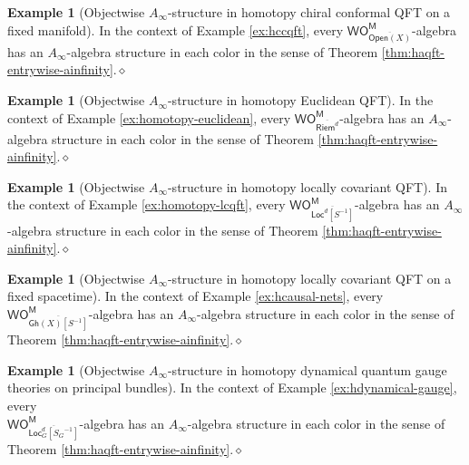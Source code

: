 \documentclass[11pt]{amsbook}
\numberwithin{section}{chapter}
\numberwithin{subsection}{section}
\numberwithin{equation}{section}
\theoremstyle{plain}
\theoremstyle{definition}
\newtheorem{example}[equation]{Example}
\newcommand{\M}{\mathsf{M}}
\renewcommand{\O}{\mathsf{O}}
\newcommand{\Otom}{\O^{\M}}
\newcommand{\W}{\mathsf{W}}
\newcommand{\dqed}{\hfill$\diamond$}
\newcommand{\inv}[1]{{#1}^{-1}}
\newcommand{\Sinv}{\inv{S}}
\newcommand{\Bgloc}{\Locd_G}
\newcommand{\Bglocsginv}{\Bgloc[\inv{S_G}]}
\newcommand{\Bglocsginvbar}{\overline{\Bglocsginv}}
\newcommand{\Gh}{\mathsf{Gh}}
\newcommand{\Ghx}{\Gh(X)}
\newcommand{\Ghxsinvbar}{\overline{\Ghx[\Sinv]}}
\newcommand{\Loc}{\mathsf{Loc}}
\newcommand{\Locd}{\Loc^d}
\newcommand{\Locdsinv}{\Locd[\Sinv]}
\newcommand{\Locdsinvbar}{\overline{\Locdsinv}}
\newcommand{\Open}{\mathsf{Open}}
\newcommand{\Openx}{\Open(X)}
\newcommand{\Openxbar}{\overline{\Openx}}
\newcommand{\Riem}{\mathsf{Riem}}
\newcommand{\Riemd}{\Riem^d}
\newcommand{\Riemdbar}{\overline{\Riemd}}
\newcommand{\wom}{\W\Otom}
\begin{document}
\begin{example}[Objectwise $A_\infty$-structure in homotopy chiral conformal QFT on a fixed manifold]\label{ex:ainfinity-hccqft-manifold}
In the context of Example \ref{ex:hccqft}, every $\wom_{\Openxbar}$-algebra has an $A_\infty$-algebra structure in each color in the sense of Theorem \ref{thm:haqft-entrywise-ainfinity}.\dqed
\end{example}

\begin{example}[Objectwise $A_\infty$-structure in homotopy Euclidean QFT]\label{ex:ainfinity-euclidean}
In the context of Example \ref{ex:homotopy-euclidean}, every $\wom_{\Riemdbar}$-algebra has an $A_\infty$-algebra structure in each color in the sense of Theorem \ref{thm:haqft-entrywise-ainfinity}.\dqed
\end{example}

\begin{example}[Objectwise $A_\infty$-structure in homotopy locally covariant QFT]\label{ex:ainfinity-hlcqft}
In the context of Example \ref{ex:homotopy-lcqft}, every $\wom_{\Locdsinvbar}$-algebra has an $A_\infty$-algebra structure in each color in the sense of Theorem \ref{thm:haqft-entrywise-ainfinity}.\dqed
\end{example}

\begin{example}[Objectwise $A_\infty$-structure in homotopy locally covariant QFT on a fixed spacetime]\label{ex:ainfinity-hlcqft-fixed}
In the context of Example \ref{ex:hcausal-nets}, every  $\wom_{\Ghxsinvbar}$-algebra has an $A_\infty$-algebra structure in each color in the sense of Theorem \ref{thm:haqft-entrywise-ainfinity}.\dqed
\end{example}

\begin{example}[Objectwise $A_\infty$-structure in homotopy dynamical quantum gauge theories on principal bundles]\label{ex:ainfinity-dynamical}
In the context of Example \ref{ex:hdynamical-gauge},  every\\ $\wom_{\Bglocsginvbar}$-algebra has an $A_\infty$-algebra structure in each color in the sense of Theorem \ref{thm:haqft-entrywise-ainfinity}.\dqed
\end{example}
\end{document}
